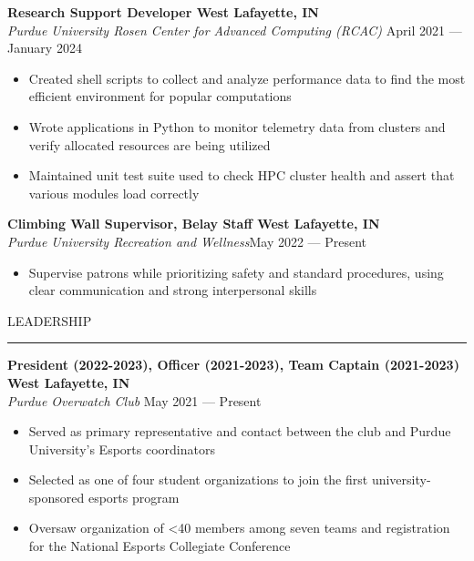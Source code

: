 \documentclass[letter,11pt]{article}
\begin{document}
\textbf{Research Support Developer \hfill West Lafayette, IN}\\
\emph{Purdue University Rosen Center for Advanced Computing (RCAC)} \hfill April 2021 --- January 2024 \\
\vspace*{-1.75em}
\begin{itemize}[label=-, leftmargin=*, labelwidth=1.5cm, align=left, noitemsep]
    \item Created shell scripts to collect and analyze performance data to find the most efficient environment for popular computations
    \item Wrote applications in Python to monitor telemetry data from clusters and verify allocated resources are being utilized
    \item Maintained unit test suite used to check HPC cluster health and assert that various modules load correctly
\end{itemize}
\vspace*{-0.25em}

\textbf{Climbing Wall Supervisor, Belay Staff \hfill West Lafayette, IN}\\
\emph{Purdue University Recreation and Wellness}\hfill May 2022 --- Present \\
\vspace*{-1.75em}
\begin{itemize}[label=-, leftmargin=*, labelwidth=1.5cm, align=left, noitemsep]
    \item Supervise patrons while prioritizing safety and standard procedures, using clear communication and strong interpersonal skills
\end{itemize}

LEADERSHIP

\vspace*{-1.25em}
\rule{\textwidth}{1.2pt}
\textbf{President (2022-2023), Officer (2021-2023), Team Captain (2021-2023) \hfill West Lafayette, IN}\\
\emph{Purdue Overwatch Club} \hfill May 2021 --- Present\\
\vspace*{-1.75em}
\begin{itemize}[label=-, leftmargin=*, align=left, noitemsep]
    \item Served as primary representative and contact between the club and Purdue University's Esports coordinators
    \item Selected as one of four student organizations to join the first university-sponsored esports program
    \item Oversaw organization of <40 members among seven teams and registration for the National Esports Collegiate Conference
\end{itemize}
\vspace*{-0.25em}
\end{document}
